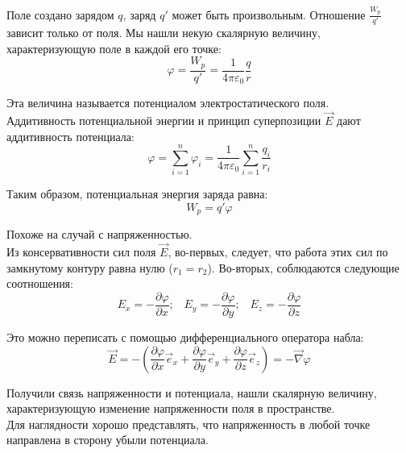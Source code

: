 \documentclass{article}
\begin{document}
	Поле создано зарядом $q$, заряд $q'$ может быть произвольным. Отношение $\frac{W_p}{q'}$ зависит только от поля. Мы нашли некую скалярную величину, характеризующую поле в каждой его точке:
	\begin{equation}
		\varphi = \frac{W_p}{q'} = \frac{1}{4\pi\varepsilon_0}\frac{q}{r}
	\end{equation}

	Эта величина называется потенциалом электростатического поля.\\

	Аддитивность потенциальной энергии и принцип суперпозиции $\vec E$ дают аддитивность потенциала:
	\begin{equation}
		\varphi = \sum_{i=1}^n \varphi_i = \frac{1}{4\pi\varepsilon_0}\sum_{i=1}^{n}\frac{q_i}{r_i}
	\end{equation}

	Таким образом, потенциальная энергия заряда равна:
	\begin{equation}
		W_p = q'\varphi
	\end{equation}

	Похоже на случай с напряженностью.\\

	Из консервативности сил поля $\vec E$, во-первых, следует, что работа этих сил по замкнутому контуру равна нулю ($r_1=r_2$). Во-вторых, соблюдаются следующие соотношения:
	\begin{equation}
		E_x = -\frac{\partial\varphi}{\partial x}; \;\;\;
		E_y = -\frac{\partial\varphi}{\partial y}; \;\;\;
		E_z = -\frac{\partial\varphi}{\partial z}
	\end{equation}

	Это можно переписать с помощью дифференциального оператора набла:
	\begin{equation}
		\vec E = -(\frac{\partial\varphi}{\partial x}\vec e_x + \frac{\partial\varphi}{\partial y}\vec e_y + \frac{\partial\varphi}{\partial z}\vec e_z) = -\vec\nabla \varphi
	\end{equation}

	Получили связь напряженности и потенциала, нашли скалярную величину, характеризующую изменение напряженности поля в пространстве.\\

	Для наглядности хорошо представлять, что напряженность в любой точке направлена в сторону убыли потенциала.
\end{document}
